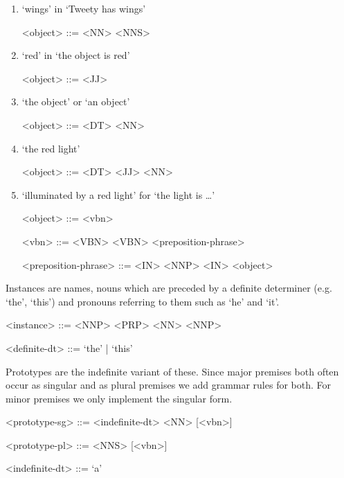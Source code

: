 \begin{enumerate}
    \item `wings' in `Tweety has wings'
    \begin{grammar}
        <object> ::= <NN> \alt <NNS>
    \end{grammar}

    \item `red' in `the object is red'
    \begin{grammar}
        <object> ::= <JJ>
    \end{grammar}

    \item `the object' or `an object'
    \begin{grammar}
        <object> ::= <DT> <NN>
    \end{grammar}

    \item `the red light'
    \begin{grammar}
        <object> ::= <DT> <JJ> <NN>
    \end{grammar}

    \item `illuminated by a red light' for `the light is …'
    \begin{grammar}
        <object> ::= <vbn>

        <vbn> ::= <VBN>
        \alt <VBN> <preposition-phrase>

        <preposition-phrase> ::= <IN> <NNP>
        \alt <IN> <object>
    \end{grammar}
\end{enumerate}

\noindent Instances are names, nouns which are preceded by a definite determiner (e.g. `the', `this') and pronouns referring to them such as `he' and `it'.

\begin{grammar}
<instance> ::= <NNP>
\alt <PRP>
 <NN>
 <NNP>

<definite-dt> ::= `the' | `this'
\end{grammar}

Prototypes are the indefinite variant of these. Since major premises both often occur as singular and as plural premises we add grammar rules for both. For minor premises we only implement the singular form.

\begin{grammar}
<prototype-sg> ::= <indefinite-dt> <NN> [<vbn>]

<prototype-pl> ::= <NNS> [<vbn>]

<indefinite-dt> ::= `a'
\end{grammar}

